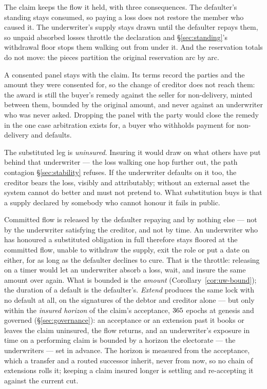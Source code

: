 The claim keeps the flow it held, with three consequences. The defaulter's standing stays
consumed, so paying a loss does not restore the member who caused it. The underwriter's
supply stays drawn until the defaulter repays them, so unpaid absorbed losses throttle
the declaration and \S\ref{sec:standing}'s withdrawal floor stops them walking out from
under it. And the reservation totals do not move: the pieces partition the original
reservation arc by arc.

A consented panel stays with the claim. Its terms record the parties and the amount they
were consented for, so the change of creditor does not reach them: the award is still the
buyer's remedy against the seller for non-delivery, minted between them, bounded by the
original amount, and never against an underwriter who was never asked. Dropping the panel
with the party would close the remedy in the one case arbitration exists for, a buyer who
withholds payment for non-delivery and defaults.

The substituted leg is \emph{uninsured}. Insuring it would draw on what others have put
behind that underwriter --- the loss walking one hop further out, the path contagion
\S\ref{sec:stability} refuses. If the underwriter defaults on it too, the creditor bears
the loss, visibly and attributably; without an external asset the system cannot do better
and must not pretend to. What substitution buys is that a supply declared by somebody who
cannot honour it fails in public.

\begin{remark}
\label{rem:uw-duration}
Committed flow is released by the defaulter repaying and by nothing else --- not by the
underwriter satisfying the creditor, and not by time. An underwriter who has honoured a
substituted obligation in full therefore stays floored at the committed flow, unable to
withdraw the supply, exit the role or put a date on either, for as long as the defaulter
declines to cure. That is the throttle: releasing on a timer would let an underwriter
absorb a loss, wait, and insure the same amount over again. What is bounded is the
\emph{amount} (Corollary~\ref{cor:uw-bound}); the duration of a default is the defaulter's.
\emph{Extend} produces the same lock with no default at all, on the signatures of the
debtor and creditor alone --- but only within the \emph{insured horizon} of the claim's
acceptance, $365$ epochs at genesis and governed
(\S\ref{sec:governance}): an acceptance or an extension past it books or leaves the claim
uninsured, the flow returns, and an underwriter's exposure in time on a performing claim is
bounded by a horizon the electorate --- the underwriters --- set in advance. The horizon
is measured from the acceptance, which a transfer and a routed successor inherit, never
from now, so no chain of extensions rolls it; keeping a claim insured longer is settling
and re-accepting it against the current cut.
\end{remark}

